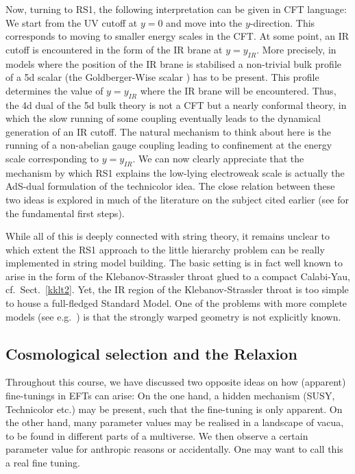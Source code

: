 \documentclass[12pt]{article}
\numberwithin{equation}{section}
\begin{document}
Now, turning to RS1, the following interpretation can be given in CFT language: We start from the UV cutoff at $y=0$ and move into the $y$-direction. This corresponds to moving to smaller energy scales in the CFT. At some point, an IR cutoff is encountered in the form of the IR brane at $y=y_{I\!R}$. More precisely, in models where the position of the IR brane is stabilised a non-trivial bulk profile of a 5d scalar (the Goldberger-Wise scalar \cite{Goldberger:1999uk}) has to be present. This profile determines the value of $y=y_{I\!R}$ where the IR brane will be encountered. Thus, the 4d dual of the 5d bulk theory is not a CFT but a nearly conformal theory, in which the slow running of some coupling eventually leads to the dynamical generation of an IR cutoff. The natural mechanism to think about here is the running of a non-abelian gauge coupling leading to confinement at the energy scale corresponding to $y=y_{I\!R}$. We can now clearly appreciate that the mechanism by which RS1 explains the low-lying electroweak scale is actually the AdS-dual formulation of the technicolor idea. The close relation between these two ideas is explored in much of the literature on the subject cited earlier (see \cite{Gubser:1999vj, ArkaniHamed:2000ds} for the fundamental first steps).

While all of this is deeply connected with string theory, it remains unclear to which extent the RS1 approach to the little hierarchy problem can be really implemented in string model building. The basic setting is in fact well known to arise in the form of the Klebanov-Strassler throat glued to a compact Calabi-Yau, cf.~Sect.~\ref{kklt2}. Yet, the IR region of the Klebanov-Strassler throat is too simple to house a full-fledged Standard Model. One of the problems with more complete models (see e.g.~\cite{Cascales:2003wn, Cascales:2005rj}) is that the strongly warped geometry is not explicitly known.





\subsection{Cosmological selection and the Relaxion}
Throughout this course, we have discussed two opposite ideas on how (apparent) fine-tunings in EFTs can arise: On the one hand, a hidden mechanism (SUSY, Technicolor etc.) may be present, such that the fine-tuning is only apparent. On the other hand, many parameter values may be realised in a landscape of vacua, to be found in different parts of a multiverse. We then observe  a certain parameter value for anthropic reasons or accidentally. One may want to call this a real fine tuning.
\end{document}
